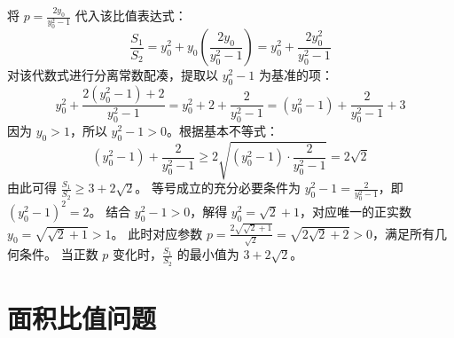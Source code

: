 \begin{solution}
将 $p = \frac{2y_0}{y_0^2 - 1}$ 代入该比值表达式：
\[ \frac{S_1}{S_2} = y_0^2 + y_0 \left( \frac{2y_0}{y_0^2 - 1} \right) = y_0^2 + \frac{2y_0^2}{y_0^2 - 1} \]
对该代数式进行分离常数配凑，提取以 $y_0^2 - 1$ 为基准的项：
\[ y_0^2 + \frac{2(y_0^2 - 1) + 2}{y_0^2 - 1} = y_0^2 + 2 + \frac{2}{y_0^2 - 1} = (y_0^2 - 1) + \frac{2}{y_0^2 - 1} + 3 \]
因为 $y_0 > 1$，所以 $y_0^2 - 1 > 0$。根据基本不等式：
\[ (y_0^2 - 1) + \frac{2}{y_0^2 - 1} \ge 2\sqrt{ (y_0^2 - 1) \cdot \frac{2}{y_0^2 - 1} } = 2\sqrt{2} \]
由此可得 $\frac{S_1}{S_2} \ge 3 + 2\sqrt{2}$。
等号成立的充分必要条件为 $y_0^2 - 1 = \frac{2}{y_0^2 - 1}$，即 $(y_0^2 - 1)^2 = 2$。
结合 $y_0^2 - 1 > 0$，解得 $y_0^2 = \sqrt{2} + 1$，对应唯一的正实数 $y_0 = \sqrt{\sqrt{2} + 1} > 1$。
此时对应参数 $p = \frac{2\sqrt{\sqrt{2}+1}}{\sqrt{2}} = \sqrt{2\sqrt{2}+2} > 0$，满足所有几何条件。
当正数 $p$ 变化时，$\frac{S_1}{S_2}$ 的最小值为 $3 + 2\sqrt{2}$。
\end{solution}


\section{面积比值问题}

